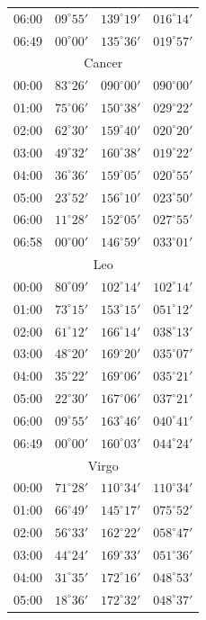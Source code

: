 \begin{table}[!h]
\begin{Parallel}{}{}
{{\begin{tabular}{l|lll}
06:00 & $09^\circ 55'$ & $139^\circ 19'$ & $016^\circ 14'$\\
06:49 & $00^\circ 00'$ & $135^\circ 36'$ & $019^\circ 57'$\\
\multicolumn{4}{c}{Cancer}\\
00:00 & $83^\circ 26'$ & $090^\circ 00'$ & $090^\circ 00'$\\
01:00 & $75^\circ 06'$ & $150^\circ 38'$ & $029^\circ 22'$\\
02:00 & $62^\circ 30'$ & $159^\circ 40'$ & $020^\circ 20'$\\
03:00 & $49^\circ 32'$ & $160^\circ 38'$ & $019^\circ 22'$\\
04:00 & $36^\circ 36'$ & $159^\circ 05'$ & $020^\circ 55'$\\
05:00 & $23^\circ 52'$ & $156^\circ 10'$ & $023^\circ 50'$\\
06:00 & $11^\circ 28'$ & $152^\circ 05'$ & $027^\circ 55'$\\
06:58 & $00^\circ 00'$ & $146^\circ 59'$ & $033^\circ 01'$\\
\multicolumn{4}{c}{Leo}\\
00:00 & $80^\circ 09'$ & $102^\circ 14'$ & $102^\circ 14'$\\
01:00 & $73^\circ 15'$ & $153^\circ 15'$ & $051^\circ 12'$\\
02:00 & $61^\circ 12'$ & $166^\circ 14'$ & $038^\circ 13'$\\
03:00 & $48^\circ 20'$ & $169^\circ 20'$ & $035^\circ 07'$\\
04:00 & $35^\circ 22'$ & $169^\circ 06'$ & $035^\circ 21'$\\
05:00 & $22^\circ 30'$ & $167^\circ 06'$ & $037^\circ 21'$\\
06:00 & $09^\circ 55'$ & $163^\circ 46'$ & $040^\circ 41'$\\
06:49 & $00^\circ 00'$ & $160^\circ 03'$ & $044^\circ 24'$\\
\multicolumn{4}{c}{Virgo}\\
00:00 & $71^\circ 28'$ & $110^\circ 34'$ & $110^\circ 34'$\\
01:00 & $66^\circ 49'$ & $145^\circ 17'$ & $075^\circ 52'$\\
02:00 & $56^\circ 33'$ & $162^\circ 22'$ & $058^\circ 47'$\\
03:00 & $44^\circ 24'$ & $169^\circ 33'$ & $051^\circ 36'$\\
04:00 & $31^\circ 35'$ & $172^\circ 16'$ & $048^\circ 53'$\\
05:00 & $18^\circ 36'$ & $172^\circ 32'$ & $048^\circ 37'$\\

\end{tabular}}}
\end{Parallel}
\end{table}
